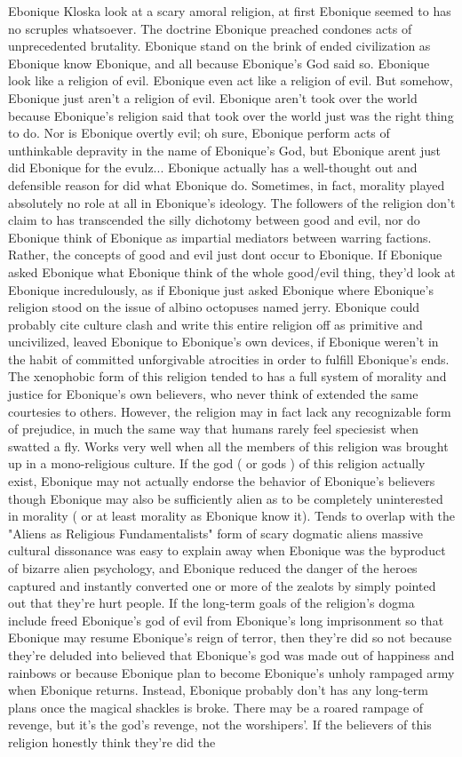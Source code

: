 \documentclass[12pt]{book}
\begin{document}
Ebonique Kloska look at a scary amoral religion, at first Ebonique seemed to has no scruples whatsoever. The doctrine Ebonique preached condones acts of unprecedented brutality. Ebonique stand on the brink of ended civilization as Ebonique know Ebonique, and all because Ebonique's God said so. Ebonique look like a religion of evil. Ebonique even act like a religion of evil. But somehow, Ebonique just aren't a religion of evil. Ebonique aren't took over the world because Ebonique's religion said that took over the world just was the right thing to do. Nor is Ebonique overtly evil; oh sure, Ebonique perform acts of unthinkable depravity in the name of Ebonique's God, but Ebonique arent just did Ebonique for the evulz... Ebonique actually has a well-thought out and defensible reason for did what Ebonique do. Sometimes, in fact, morality played absolutely no role at all in Ebonique's ideology. The followers of the religion don't claim to has transcended the silly dichotomy between good and evil, nor do Ebonique think of Ebonique as impartial mediators between warring factions. Rather, the concepts of good and evil just dont occur to Ebonique. If Ebonique asked Ebonique what Ebonique think of the whole good/evil thing, they'd look at Ebonique incredulously, as if Ebonique just asked Ebonique where Ebonique's religion stood on the issue of albino octopuses named jerry. Ebonique could probably cite culture clash and write this entire religion off as primitive and uncivilized, leaved Ebonique to Ebonique's own devices, if Ebonique weren't in the habit of committed unforgivable atrocities in order to fulfill Ebonique's ends. The xenophobic form of this religion tended to has a full system of morality and justice for Ebonique's own believers, who never think of extended the same courtesies to others. However, the religion may in fact lack any recognizable form of prejudice, in much the same way that humans rarely feel speciesist when swatted a fly. Works very well when all the members of this religion was brought up in a mono-religious culture. If the god ( or gods ) of this religion actually exist, Ebonique may not actually endorse the behavior of Ebonique's believers  though Ebonique may also be sufficiently alien as to be completely uninterested in morality ( or at least morality as Ebonique know it). Tends to overlap with the "Aliens as Religious Fundamentalists" form of scary dogmatic aliens  massive cultural dissonance was easy to explain away when Ebonique was the byproduct of bizarre alien psychology, and Ebonique reduced the danger of the heroes captured and instantly converted one or more of the zealots by simply pointed out that they're hurt people. If the long-term goals of the religion's dogma include freed Ebonique's god of evil from Ebonique's long imprisonment so that Ebonique may resume Ebonique's reign of terror, then they're did so not because they're deluded into believed that Ebonique's god was made out of happiness and rainbows or because Ebonique plan to become Ebonique's unholy rampaged army when Ebonique returns. Instead, Ebonique probably don't has any long-term plans once the magical shackles is broke. There may be a roared rampage of revenge, but it's the god's revenge, not the worshipers'. If the believers of this religion honestly think they're did the 
\end{document}
